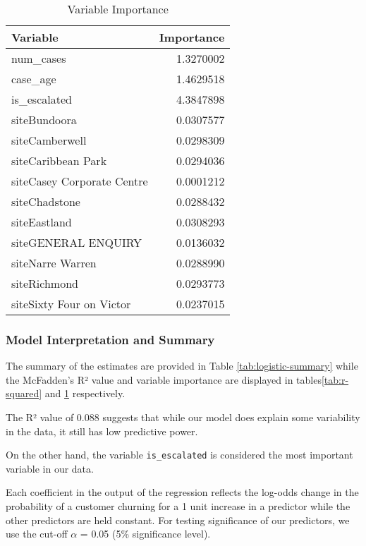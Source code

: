\documentclass[
]{article}
\begin{document}
\begin{table}

\caption{\label{tab:variable-imp}Variable Importance}
\centering
\begin{tabular}[t]{l|r}
\hline
Variable & Importance\\
\hline
num\_cases & 1.3270002\\
\hline
case\_age & 1.4629518\\
\hline
is\_escalated & 4.3847898\\
\hline
siteBundoora & 0.0307577\\
\hline
siteCamberwell & 0.0298309\\
\hline
siteCaribbean Park & 0.0294036\\
\hline
siteCasey Corporate Centre & 0.0001212\\
\hline
siteChadstone & 0.0288432\\
\hline
siteEastland & 0.0308293\\
\hline
siteGENERAL ENQUIRY & 0.0136032\\
\hline
siteNarre Warren & 0.0288990\\
\hline
siteRichmond & 0.0293773\\
\hline
siteSixty Four on Victor & 0.0237015\\
\hline
\end{tabular}
\end{table}

\subsubsection{Model Interpretation and Summary}\label{model-interpretation-and-summary}

The summary of the estimates are provided in Table \ref{tab:logistic-summary} while the McFadden's R² value and variable importance are displayed in tables\ref{tab:r-squared} and \ref{tab:variable-imp} respectively.

The R² value of 0.088 suggests that while our model does explain some variability in the data, it still has low predictive power.

On the other hand, the variable \texttt{is\_escalated} is considered the most important variable in our data.

Each coefficient in the output of the regression reflects the log-odds change in the probability of a customer churning for a 1 unit increase in a predictor while the other predictors are held constant. For testing significance of our predictors, we use the cut-off \(\alpha\) = 0.05 (5\% significance level).
\end{document}
